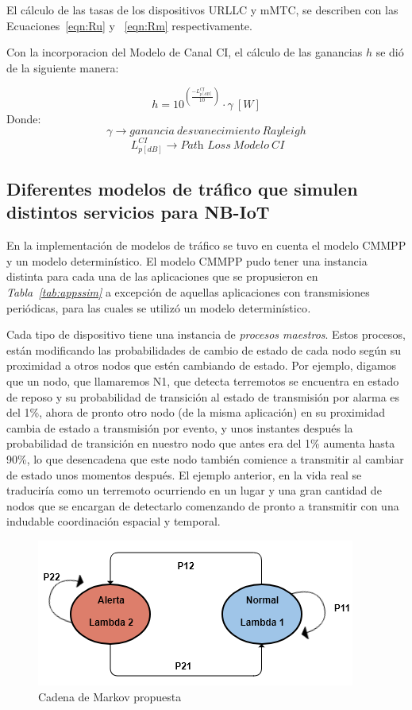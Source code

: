El cálculo de las tasas de los dispositivos URLLC y mMTC, se describen con las Ecuaciones~\ref{eqn:Ru} y ~\ref{eqn:Rm} respectivamente.\newline

Con la incorporacion del Modelo de Canal CI, el cálculo de las ganancias $h$ se dió de la siguiente manera:

\begin{equation}
    h =  10^{(\frac{-L_{p [dB]}^{CI}}{10})} \cdot \gamma\ [W]
    \label{eqn:h_canal}
\end{equation}
Donde:
\[\gamma \to ganancia\ desvanecimiento\ Rayleigh\]
\[\ L_{p [dB]}^{CI} \to \textit{Path\ Loss}\ Modelo\ CI \]

\subsection{Diferentes modelos de tráfico que simulen distintos servicios para NB-IoT}

En la implementación de modelos de tráfico se tuvo en cuenta el modelo CMMPP y un modelo determinístico. El modelo CMMPP pudo tener una instancia distinta para cada una de las aplicaciones que se propusieron en \textit{Tabla~\ref{tab:appssim} } a excepción de aquellas aplicaciones con transmisiones periódicas, para las cuales se utilizó un modelo determinístico\textit{.}\newline

Cada tipo de dispositivo tiene una instancia de \textit{procesos maestros}. Estos procesos, están modificando las probabilidades de cambio de estado de cada nodo según su proximidad a otros nodos que estén cambiando de estado. Por ejemplo, digamos que un nodo, que llamaremos N1, que detecta terremotos se encuentra en estado de reposo y su probabilidad de transición al estado de transmisión por alarma es del 1\%, ahora de pronto otro nodo (de la misma aplicación) en su proximidad cambia de estado a transmisión por evento, y unos instantes después la probabilidad de transición en nuestro nodo que antes era del 1\% aumenta hasta 90\%, lo que desencadena que este nodo también comience a transmitir al cambiar de estado unos momentos después. El ejemplo anterior, en la vida real se traduciría como un terremoto ocurriendo en un lugar y una gran cantidad de nodos que se encargan de detectarlo comenzando de pronto a transmitir con una indudable coordinación espacial y temporal.\newline

\begin{figure}[th]
\centering
\includegraphics[scale=1]{Figures/Cadena de Markov propuesta}
\decoRule
\caption[Cadena de Markov propuesta]{Cadena de Markov propuesta}
\label{fig:CMMPPpropuesta}
\end{figure}

